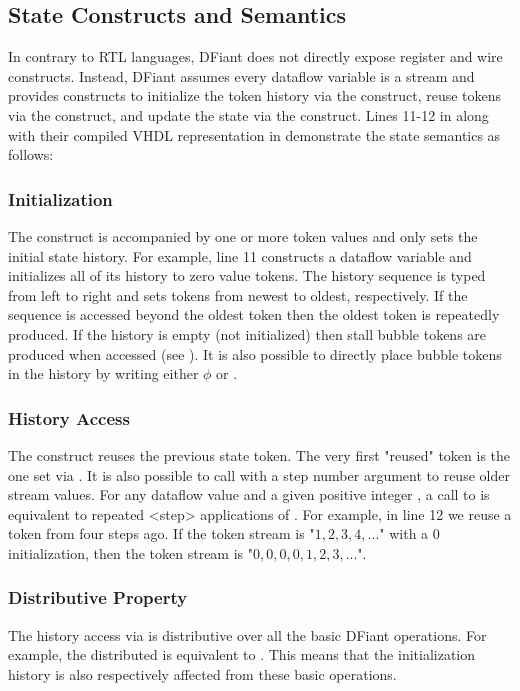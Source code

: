 \subsection{State Constructs and Semantics}
\label{sec:state_constructs}
In contrary to RTL languages, DFiant does not directly expose register and wire constructs. Instead, DFiant assumes every dataflow variable is a stream and provides constructs to initialize the token history via the  construct, reuse tokens via the  construct, and update the state via the \code{:=} construct. Lines 11-12 in  along with their compiled VHDL representation in  demonstrate the state semantics as follows:

\subsubsection{Initialization} The  construct is accompanied by one or more token values and only sets the initial state history. For example, line 11 constructs a dataflow variable and initializes all of its history to zero value tokens. The history sequence is typed from left to right and sets tokens from newest to oldest, respectively. If the sequence is accessed beyond the oldest token then the oldest token is repeatedly produced. If the history is empty (not initialized) then stall bubble tokens are produced when accessed (see ). It is also possible to directly place bubble tokens in the history by writing either $\phi$ or .  

\subsubsection{History Access} The  construct reuses the previous state token. The very first "reused" token is the one set via . It is also possible to call  with a step number argument to reuse older stream values. For any dataflow value  and a given positive integer , a call to  is equivalent to repeated <step> applications of .
For example, in line 12 we reuse a  token from four steps ago. If the  token stream is "$1,2,3,4,...$" with a $0$ initialization, then the  token stream is "$0,0,0,0,1,2,3,...$".

\subsubsection{Distributive Property} The history access via  is distributive over all the basic DFiant operations. For example, the distributed  is equivalent to . This means that the initialization history is also respectively affected from these basic operations.
 
